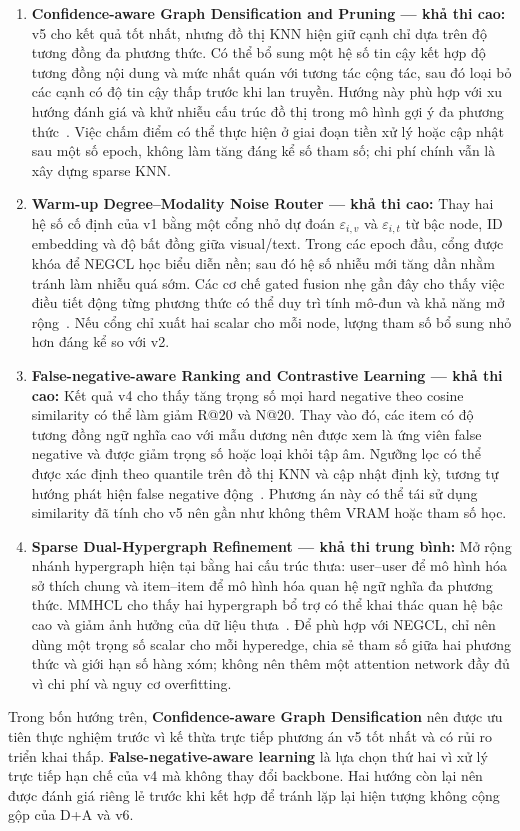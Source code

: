 \begin{enumerate}[leftmargin=*,label=\textbf{Hướng \arabic*.}]
    \item \textbf{Confidence-aware Graph Densification and Pruning --- khả thi cao:}
    v5 cho kết quả tốt nhất, nhưng đồ thị KNN hiện giữ cạnh chỉ dựa trên độ tương đồng đa phương thức. Có thể bổ sung một hệ số tin cậy kết hợp độ tương đồng nội dung và mức nhất quán với tương tác cộng tác, sau đó loại bỏ các cạnh có độ tin cậy thấp trước khi lan truyền. Hướng này phù hợp với xu hướng đánh giá và khử nhiễu cấu trúc đồ thị trong mô hình gợi ý đa phương thức~\cite{qi2025even}. Việc chấm điểm có thể thực hiện ở giai đoạn tiền xử lý hoặc cập nhật sau một số epoch, không làm tăng đáng kể số tham số; chi phí chính vẫn là xây dựng sparse KNN.

    \item \textbf{Warm-up Degree--Modality Noise Router --- khả thi cao:}
    Thay hai hệ số cố định của v1 bằng một cổng nhỏ dự đoán $\varepsilon_{i,v}$ và $\varepsilon_{i,t}$ từ bậc node, ID embedding và độ bất đồng giữa visual/text. Trong các epoch đầu, cổng được khóa để NEGCL học biểu diễn nền; sau đó hệ số nhiễu mới tăng dần nhằm tránh làm nhiễu quá sớm. Các cơ chế gated fusion nhẹ gần đây cho thấy việc điều tiết động từng phương thức có thể duy trì tính mô-đun và khả năng mở rộng~\cite{liu2025gated}. Nếu cổng chỉ xuất hai scalar cho mỗi node, lượng tham số bổ sung nhỏ hơn đáng kể so với v2.

    \item \textbf{False-negative-aware Ranking and Contrastive Learning --- khả thi cao:}
    Kết quả v4 cho thấy tăng trọng số mọi hard negative theo cosine similarity có thể làm giảm R@20 và N@20. Thay vào đó, các item có độ tương đồng ngữ nghĩa cao với mẫu dương nên được xem là ứng viên false negative và được giảm trọng số hoặc loại khỏi tập âm. Ngưỡng lọc có thể được xác định theo quantile trên đồ thị KNN và cập nhật định kỳ, tương tự hướng phát hiện false negative động~\cite{balmaseda2025glofnd}. Phương án này có thể tái sử dụng similarity đã tính cho v5 nên gần như không thêm VRAM hoặc tham số học.

    \item \textbf{Sparse Dual-Hypergraph Refinement --- khả thi trung bình:}
    Mở rộng nhánh hypergraph hiện tại bằng hai cấu trúc thưa: user--user để mô hình hóa sở thích chung và item--item để mô hình hóa quan hệ ngữ nghĩa đa phương thức. MMHCL cho thấy hai hypergraph bổ trợ có thể khai thác quan hệ bậc cao và giảm ảnh hưởng của dữ liệu thưa~\cite{guo2025mmhcl}. Để phù hợp với NEGCL, chỉ nên dùng một trọng số scalar cho mỗi hyperedge, chia sẻ tham số giữa hai phương thức và giới hạn số hàng xóm; không nên thêm một attention network đầy đủ vì chi phí và nguy cơ overfitting.
\end{enumerate}

Trong bốn hướng trên, \textbf{Confidence-aware Graph Densification} nên được ưu tiên thực nghiệm trước vì kế thừa trực tiếp phương án v5 tốt nhất và có rủi ro triển khai thấp. \textbf{False-negative-aware learning} là lựa chọn thứ hai vì xử lý trực tiếp hạn chế của v4 mà không thay đổi backbone. Hai hướng còn lại nên được đánh giá riêng lẻ trước khi kết hợp để tránh lặp lại hiện tượng không cộng gộp của D+A và v6.
